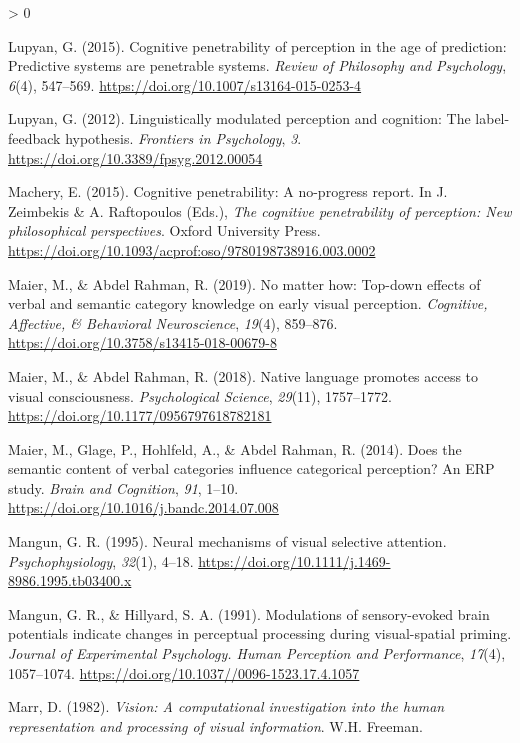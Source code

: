 \documentclass[
  english,
  doc,12pt,twoside,floatsintext]{apa7}
\newlength{\cslhangindent}
\newenvironment{CSLReferences}[2] %
 {%
  \setlength{\parindent}{0pt}
  \ifodd #1 \everypar{\setlength{\hangindent}{\cslhangindent}}\ignorespaces\fi
  \ifnum #2 > 0
  \setlength{\parskip}{#2\baselineskip}
  \fi
 }%
 {}
\begin{document}
\begin{CSLReferences}{1}{0}
\leavevmode\hypertarget{ref-lupyan2015}{}%
Lupyan, G. (2015). Cognitive penetrability of perception in the age of prediction: Predictive systems are penetrable systems. \emph{Review of Philosophy and Psychology}, \emph{6}(4), 547--569. \url{https://doi.org/10.1007/s13164-015-0253-4}

\leavevmode\hypertarget{ref-lupyan2012}{}%
Lupyan, G. (2012). Linguistically modulated perception and cognition: The label-feedback hypothesis. \emph{Frontiers in Psychology}, \emph{3}. \url{https://doi.org/10.3389/fpsyg.2012.00054}

\leavevmode\hypertarget{ref-machery2015}{}%
Machery, E. (2015). Cognitive penetrability: A no-progress report. In J. Zeimbekis \& A. Raftopoulos (Eds.), \emph{The cognitive penetrability of perception: New philosophical perspectives}. Oxford University Press. \url{https://doi.org/10.1093/acprof:oso/9780198738916.003.0002}

\leavevmode\hypertarget{ref-maier2019}{}%
Maier, M., \& Abdel Rahman, R. (2019). No matter how: Top-down effects of verbal and semantic category knowledge on early visual perception. \emph{Cognitive, Affective, \& Behavioral Neuroscience}, \emph{19}(4), 859--876. \url{https://doi.org/10.3758/s13415-018-00679-8}

\leavevmode\hypertarget{ref-maier2018}{}%
Maier, M., \& Abdel Rahman, R. (2018). Native language promotes access to visual consciousness. \emph{Psychological Science}, \emph{29}(11), 1757--1772. \url{https://doi.org/10.1177/0956797618782181}

\leavevmode\hypertarget{ref-maier2014}{}%
Maier, M., Glage, P., Hohlfeld, A., \& Abdel Rahman, R. (2014). Does the semantic content of verbal categories influence categorical perception? An {ERP} study. \emph{Brain and Cognition}, \emph{91}, 1--10. \url{https://doi.org/10.1016/j.bandc.2014.07.008}

\leavevmode\hypertarget{ref-mangun1995}{}%
Mangun, G. R. (1995). Neural mechanisms of visual selective attention. \emph{Psychophysiology}, \emph{32}(1), 4--18. \url{https://doi.org/10.1111/j.1469-8986.1995.tb03400.x}

\leavevmode\hypertarget{ref-mangun1991}{}%
Mangun, G. R., \& Hillyard, S. A. (1991). Modulations of sensory-evoked brain potentials indicate changes in perceptual processing during visual-spatial priming. \emph{Journal of Experimental Psychology. Human Perception and Performance}, \emph{17}(4), 1057--1074. \url{https://doi.org/10.1037//0096-1523.17.4.1057}

\leavevmode\hypertarget{ref-marr1982}{}%
Marr, D. (1982). \emph{Vision: A computational investigation into the human representation and processing of visual information}. W.H. Freeman.


\end{CSLReferences}
\end{document}

